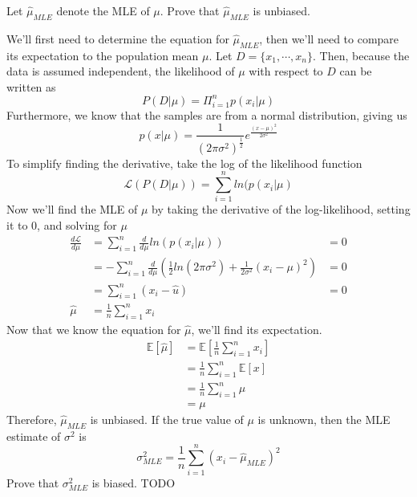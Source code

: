 \documentclass[11pt,largemargins]{homework}
\begin{document}
\begin{alphaparts}
	\questionpart Let $\hat{\mu}_{MLE}$ denote the MLE of $\mu$. Prove that $\hat{\mu}_{MLE}$ is unbiased.

	We'll first need to determine the equation for $\hat{\mu}_{MLE}$, then we'll need to compare its expectation to the population mean $\mu$.
	Let $D = \{x_1, \cdots,x_n\}$. Then, because the data is assumed independent, the likelihood of $\mu$ with respect to $D$ can be written as
	$$P(D|\mu)=\Pi_{i=1}^np(x_i|\mu)$$
	Furthermore, we know that the samples are from a normal distribution, giving us
	$$p(x|\mu) = \frac{1}{(2\pi\sigma^2)^{\frac{1}{2}}}e^\frac{(x-\mu)^2}{2\sigma^2}$$
	To simplify finding the derivative, take the log of the likelihood function
	$$\mathcal{L}(P(D|\mu))=\sum_{i=1}^{n}ln(p(x_i|\mu)$$
	Now we'll find the MLE of $\mu$ by taking the derivative of the log-likelihood, setting it to 0, and solving for $\mu$
	\begin{align*}
		\frac{d\mathcal{L}}{d\mu}&=\sum_{i=1}^{n}\frac{d}{d\mu}ln(p(x_i|\mu))&=0\\
		&=-\sum_{i=1}^{n}\frac{d}{d\mu}\left( \frac{1}{2}ln(2\pi\sigma^2)+\frac{1}{2\sigma^2}{(x_i-\mu)^2}\right)&=0\\
		&= \sum_{i=1}^{n}(x_i-\hat{u})&=0\\
		\hat{\mu}&=\frac{1}{n}\sum_{i=1}^{n}x_i
	\end{align*}
	Now that we know the equation for $\hat{\mu}$, we'll find its expectation.
	\begin{align*}
		\mathbb{E}[\hat{\mu}] &= \mathbb{E}\left[\frac{1}{n}\sum_{i=1}^{n}x_i\right]\\
		&= \frac{1}{n}\sum_{i=1}^{n}\mathbb{E}[x]\\
		&= \frac{1}{n}\sum_{i=1}^{n}\mu\\
		&= \mu
	\end{align*}
	Therefore, $\hat{\mu}_{MLE}$ is unbiased.
	\questionpart If the true value of $\mu$ is unknown, then the MLE estimate of $\sigma^2$ is
	$$\sigma^2_{MLE}=\frac{1}{n}\sum_{i=1}^{n}{(x_i-\hat{\mu}_{MLE})}^2$$
	Prove that $\sigma^2_{MLE}$ is biased.
	TODO
\end{alphaparts}
\end{document}
